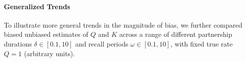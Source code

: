\paragraph{Generalized Trends}
To illustrate more general trends in the magnitude of bias,
we further compared biased \vs unbiased estimates of $Q$ and $K$ across
a range of different partnership durations $\delta \in [0.1, 10]$ and
recall periods $\omega \in [0.1, 10]$,
with fixed true rate $Q = 1$ (arbitrary units).
